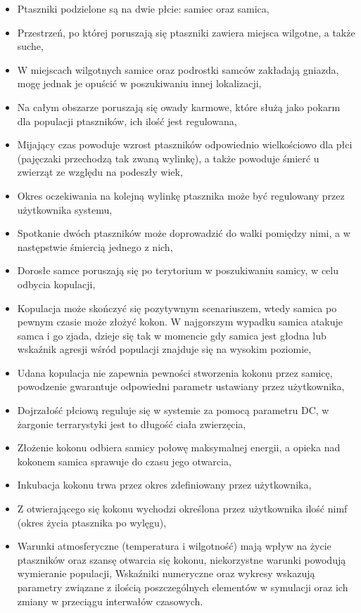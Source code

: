 \documentclass[a4paper,11pt,titlepage]{article}
\begin{document}
\begin{itemize}
  \item Ptaszniki podzielone są na dwie płcie: samiec oraz samica,  
  \item Przestrzeń, po której poruszają się ptaszniki zawiera miejsca wilgotne, a także suche, 
  \item W miejscach wilgotnych samice oraz podrostki samców zakładają gniazda, mogę jednak je opuścić w poszukiwaniu innej lokalizacji, 
  \item Na całym obszarze poruszają się owady karmowe, które służą jako pokarm dla populacji ptaszników, ich ilość jest regulowana, 
  \item Mijający czas powoduje wzrost ptaszników odpowiednio wielkościowo dla płci (pajęczaki przechodzą tak zwaną wylinkę), a także powoduje śmierć u zwierząt ze względu na podeszły wiek, 
  \item Okres oczekiwania na kolejną wylinkę ptasznika może być regulowany przez użytkownika systemu, 
  \item Spotkanie dwóch ptaszników może doprowadzić do walki pomiędzy nimi, a w następstwie śmiercią jednego z nich, 
  \item Dorosłe samce poruszają się po terytorium w poszukiwaniu samicy, w celu odbycia kopulacji, 
  \item Kopulacja może skończyć się pozytywnym scenariuszem, wtedy samica po pewnym czasie może złożyć kokon. W najgorszym wypadku samica atakuje samca i go zjada, dzieje się tak w momencie gdy samica jest głodna lub wskaźnik agresji wśród populacji znajduje się na wysokim poziomie, 
  \item Udana kopulacja nie zapewnia pewności stworzenia kokonu przez samicę, powodzenie gwarantuje odpowiedni parametr ustawiany przez użytkownika, 
  \item Dojrzałość płciową reguluje się w systemie za pomocą parametru DC, w żargonie terrarystyki jest to długość ciała zwierzęcia,  
  \item Złożenie kokonu odbiera samicy połowę maksymalnej energii, a opieka nad kokonem samica sprawuje do czasu jego otwarcia, 
  \item Inkubacja kokonu trwa przez okres zdefiniowany przez użytkownika, 
  \item Z otwierającego się kokonu wychodzi określona przez użytkownika ilość nimf (okres życia ptasznika po wylęgu), 
  \item Warunki atmosferyczne (temperatura i wilgotność) mają wpływ na życie ptaszników oraz szansę otwarcia się kokonu, niekorzystne warunki powodują wymieranie populacji, 
Wskaźniki numeryczne oraz wykresy wskazują parametry związane z ilością poszczególnych elementów w symulacji oraz ich zmiany w przeciągu interwałów czasowych. 
\end{itemize}
\end{document}

